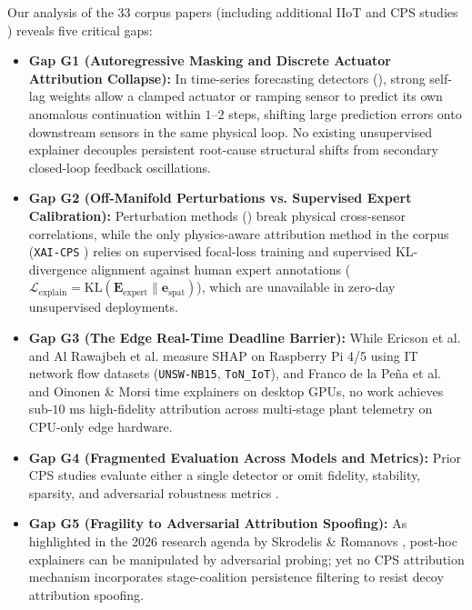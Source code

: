 \documentclass[10pt,a4paper]{article}
\begin{document}
Our analysis of the 33 corpus papers (including additional IIoT and CPS studies \cite{ha2022ifac, birihanu2024correlation, abudurexiti2025cctak, trivedi2025microgrid, eltomy2024icps, kenmogne2024netsoft, kenmogne2025hal, oseni2023tits, khan2022jiot, shoukat2025trustmyids, alani2023e2i3ds, attique2024jiot, ahakonye2024iotm, saiyed2026eshield, alrawajbeh2025mdpi}) reveals five critical gaps:
\begin{itemize}\setlength{\itemsep}{2pt}\setlength{\parskip}{0pt}
    \item \textbf{Gap G1 (Autoregressive Masking and Discrete Actuator Attribution Collapse):} In time-series forecasting detectors (\cite{deng2021gdn, tang2023grn, fung2024ndss}), strong self-lag weights allow a clamped actuator or ramping sensor to predict its own anomalous continuation within $1\text{--}2$ steps, shifting large prediction errors onto downstream sensors in the same physical loop. No existing unsupervised explainer decouples persistent root-cause structural shifts from secondary closed-loop feedback oscillations.
    \item \textbf{Gap G2 (Off-Manifold Perturbations vs. Supervised Expert Calibration):} Perturbation methods (\cite{huong2022fedex, mathuros2024waxai, franco2026shats}) break physical cross-sensor correlations, while the only physics-aware attribution method in the corpus (\texttt{XAI-CPS} \cite{rasheed2026xaicps}) relies on supervised focal-loss training and supervised KL-divergence alignment against human expert annotations ($\mathcal{L}_{\text{explain}} = \text{KL}(\mathbf{E}_{\text{expert}} \parallel \mathbf{e}_{\text{spat}})$), which are unavailable in zero-day unsupervised deployments.
    \item \textbf{Gap G3 (The Edge Real-Time Deadline Barrier):} While Ericson et al. \cite{ericson2025wfcs} and Al Rawajbeh et al. \cite{alrawajbeh2025mdpi} measure SHAP on Raspberry Pi 4/5 using IT network flow datasets (\texttt{UNSW-NB15}, \texttt{ToN\_IoT}), and Franco de la Pe\~na et al. \cite{franco2026shats} and Oinonen \& Morsi \cite{oinonen2026epsr} time explainers on desktop GPUs, no work achieves sub-$10\text{ ms}$ high-fidelity attribution across multi-stage plant telemetry on CPU-only edge hardware.
    \item \textbf{Gap G4 (Fragmented Evaluation Across Models and Metrics):} Prior CPS studies evaluate either a single detector \cite{franco2026shats, oinonen2026epsr} or omit fidelity, stability, sparsity, and adversarial robustness metrics \cite{deng2021gdn, huong2022fedex, birihanu2024correlation}.
    \item \textbf{Gap G5 (Fragility to Adversarial Attribution Spoofing):} As highlighted in the 2026 research agenda by Skrodelis \& Romanovs \cite{skrodelis2026review}, post-hoc explainers can be manipulated by adversarial probing; yet no CPS attribution mechanism incorporates stage-coalition persistence filtering to resist decoy attribution spoofing.
\end{itemize}
\end{document}

